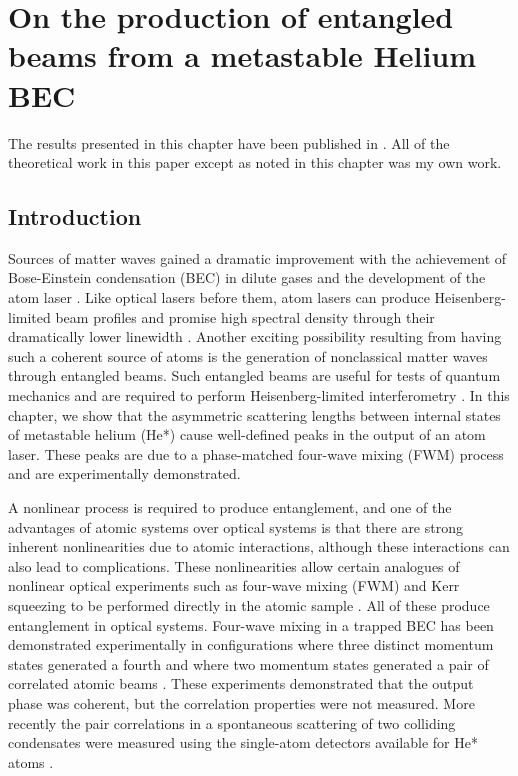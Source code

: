 \chapter{On the production of entangled beams from a metastable Helium BEC}
\label{Peaks}
\graphicspath{{Figures/Peaks/}{Figures/Common/}}

The results presented in this chapter have been published in \citet{Dall:2009}. All of the theoretical work in this paper except as noted in this chapter was my own work.

\section{Introduction}
Sources of matter waves gained a dramatic improvement with the achievement of Bose-Einstein condensation (BEC) in dilute gases and the development of the atom laser \citep{Anderson:1995vn,Mewes:1997}. Like optical lasers before them, atom lasers can produce Heisenberg-limited beam profiles \citep{Busch:2002zr,Riou:2006uq} and promise high spectral density through their dramatically lower linewidth \citep{Wiseman:1997ba}. Another exciting possibility resulting from having such a coherent source of atoms is the generation of nonclassical matter waves through entangled beams. Such entangled beams are useful for tests of quantum mechanics and are required to perform Heisenberg-limited interferometry \citep{Dowling:1998,Reid:1988}. In this chapter, we show that the asymmetric scattering lengths between internal states of metastable helium (He*) cause well-defined peaks in the output of an atom laser. These peaks are due to a phase-matched four-wave mixing (FWM) process and are experimentally demonstrated.

A nonlinear process is required to produce entanglement, and one of the advantages of atomic systems over optical systems is that there are strong inherent nonlinearities due to atomic interactions, although these interactions can also lead to complications. These nonlinearities allow certain analogues of nonlinear optical experiments such as four-wave mixing (FWM) and Kerr squeezing to be performed directly in the atomic sample \citep{WallsMilburn}. All of these produce entanglement in optical systems. Four-wave mixing in a trapped BEC has been demonstrated experimentally in configurations where three distinct momentum states generated a fourth \citep{Deng:1999qy} and where two momentum states generated a pair of correlated atomic beams \citep{Vogels:2002}. These experiments demonstrated that the output phase was coherent, but the correlation properties were not measured. More recently the pair correlations in a spontaneous scattering of two colliding condensates were measured using the single-atom detectors available for He* atoms \citep{Perrin:2007}.

